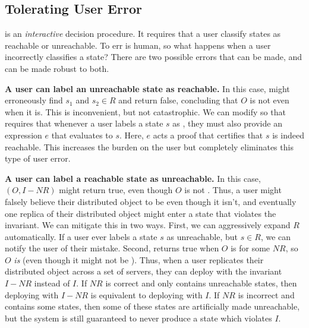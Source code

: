 \begin{techreport}
  \subsection{Tolerating User Error}
   is an \emph{interactive} decision
  procedure. It requires that a user classify states as reachable or
  unreachable.  To err is human, so what happens when a user incorrectly
  classifies a state?  There are two possible errors that can be made, and
   can be made robust to both.

  \textbf{A user can label an unreachable state as reachable.}
  In this case, \Helper{} might erroneously find $s_1$ and $s_2 \in R$ and
  return false, concluding that $O$ is not \sTIconfluent{} even when it is.
  This is inconvenient, but not catastrophic. We can modify
   so that \Helper{} requires that
  whenever a user labels a state $s$ as \sTIreachable{}, they must also provide
  an \sTIreachable{} expression $e$ that evaluates to $s$. Here, $e$ acts a
  proof that certifies that $s$ is indeed reachable. This increases the burden
  on the user but completely eliminates this type of user error.

  \textbf{A user can label a reachable state as unreachable.}
  In this case, \IsIclosed$(O, I - NR)$ might return true, even though $O$ is
  not \sTIconfluent. Thus, a user might falsely believe their distributed
  object to be \sTIconfluent{} even though it isn't, and eventually one replica
  of their distributed object might enter a state that violates the invariant.
  We can mitigate this in two ways. First, we can aggressively expand $R$
  automatically. If a user ever labels a state $s$ as unreachable, but $s \in
  R$, we can notify the user of their mistake. Second, \Helper{} returns true
  when $O$ is  for some $NR$, so $O$ \emph{is}
   (even though it might not be \sTIconfluent{}).
  Thus, when a user replicates their distributed object across a set of
  servers, they can deploy with the invariant $I - NR$ instead of $I$. If $NR$
  is correct and only contains unreachable states, then deploying with $I - NR$
  is equivalent to deploying with $I$. If $NR$ is incorrect and contains some
  \sTIreachable{} states, then some of these states are artificially made
  unreachable, but the system is still guaranteed to never produce a state
  which violates $I$.
\end{techreport}
